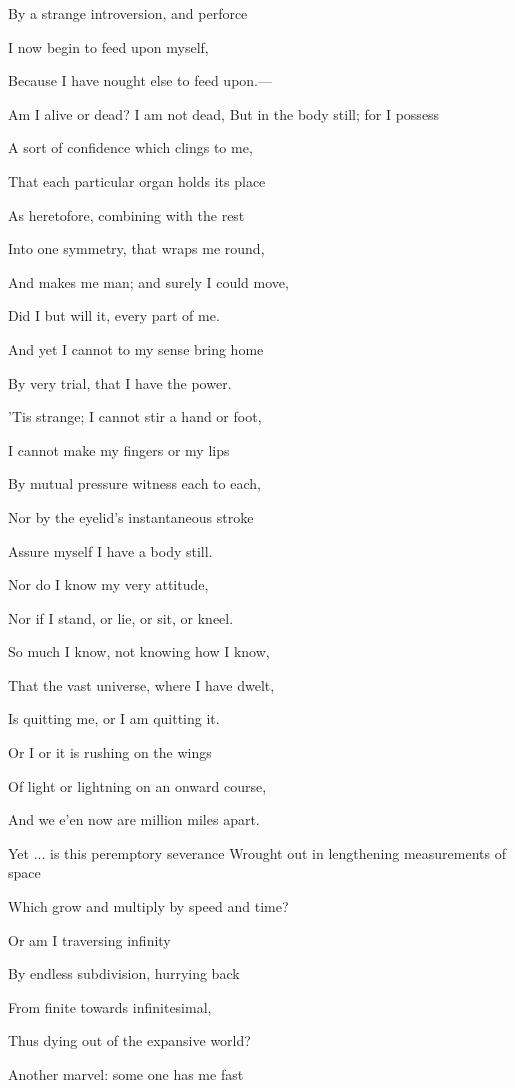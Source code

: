 By a strange introversion, and perforce

I now begin to feed upon myself,

Because I have nought else to feed upon.—

Am I alive or dead? I am not dead, But in the body still; for I possess

A sort of confidence which clings to me,

That each particular organ holds its place

As heretofore, combining with the rest

Into one symmetry, that wraps me round,

And makes me man; and surely I could move,

Did I but will it, every part of me.

And yet I cannot to my sense bring home

By very trial, that I have the power.

'Tis strange; I cannot stir a hand or foot,

I cannot make my fingers or my lips

By mutual pressure witness each to each,

Nor by the eyelid's instantaneous stroke

Assure myself I have a body still.

Nor do I know my very attitude,

Nor if I stand, or lie, or sit, or kneel.

So much I know, not knowing how I know,

That the vast universe, where I have dwelt,

Is quitting me, or I am quitting it.

Or I or it is rushing on the wings

Of light or lightning on an onward course,

And we e'en now are million miles apart.

Yet ... is this peremptory severance Wrought out in lengthening measurements of space

Which grow and multiply by speed and time?

Or am I traversing infinity

By endless subdivision, hurrying back

From finite towards infinitesimal,

Thus dying out of the expansive world?

Another marvel: some one has me fast

